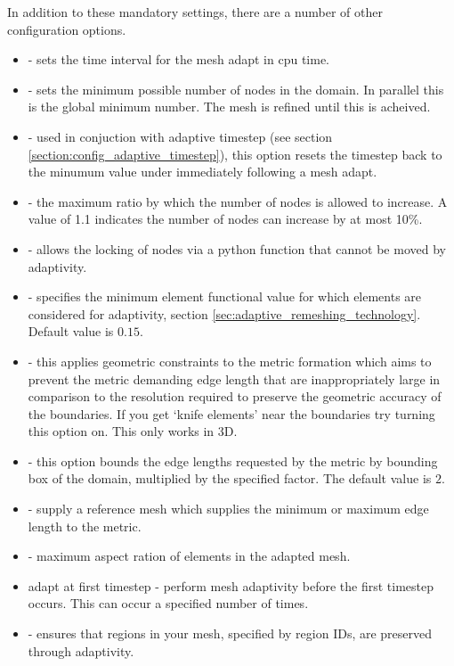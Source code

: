 In addition to these mandatory settings, there are a number of other configuration options.
\begin{itemize}
\item {} - sets the time interval for the mesh adapt in cpu time.
\item {} - sets the minimum possible number of nodes in the domain. In parallel this is the
global minimum number. The mesh is refined until this is acheived.
\item {} - used in conjuction with adaptive timestep (see section \ref{section:config_adaptive_timestep}), this
option resets the timestep back to the minumum value under  immediately following
a mesh adapt.
\item {} - the maximum ratio by which the number of nodes is allowed to increase. A value of 1.1
indicates the number of nodes can increase by at most 10\%.
\item {} - allows the locking of nodes via a python function that cannot be moved by adaptivity.
\item {} - specifies the minimum element functional value for which elements are considered for adaptivity, section \ref{sec:adaptive_remeshing_technology}. Default value is $0.15$.
\item {} - this applies geometric constraints to the metric formation which aims to prevent the metric demanding edge length that are inappropriately large in comparison to the resolution required to preserve the geometric accuracy of the boundaries. If you get `knife elements' near the boundaries try turning this option on. This only works in 3D. 
\item {} - this option bounds the edge lengths requested by the metric by bounding box of the domain, multiplied by the specified factor. The default value is $2$.
\item {} - supply a reference mesh which supplies the minimum or maximum edge length to the metric.
\item {} -  maximum aspect ration of elements in the adapted mesh.
\item adapt at first timestep - perform mesh adaptivity before the first timestep occurs. This can occur a specified number of times.
\item {} - ensures that regions in your mesh, specified by region IDs, are preserved through adaptivity.

\end{itemize}
